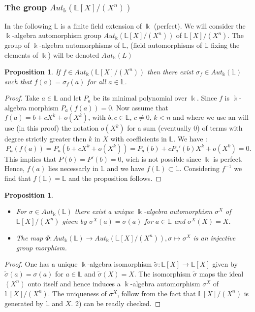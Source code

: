 \documentclass[12pt, reqno]{amsart}
\newtheorem{proposition}[theorem]{Proposition}
\newcommand{\K}{ {\Bbbk} }
\newcommand{\FL}{ {\mathbb L} }
\begin{document}
\subsubsection{The group $Aut_\K(\FL[X]/(X^n))$}
In the following $\FL$ is a finite field extension of $\K$ (perfect). We will consider the $\K$-algebra automorphism group $Aut_\K(\FL[X]/(X^n))$ of $\FL[X]/(X^n)$. The group of $\K$-algebra automorphisms of $\FL$, (field automorphisms of $\FL$ fixing the elements of $\K$) will be denoted $Aut_\K(L)$
\begin{proposition}\label{sigma}
If $f\in Aut_\K(\FL[X]/(X^n))$ then there exist $\sigma_f \in Aut_\K(\FL)$ such that $f(a)=\sigma_f(a)$ for all $a\in \FL$. 
\end{proposition}
\begin{proof}
Take $a\in \FL$ and let $P_a$ be its minimal polynomial over $\K$. Since $f$ is $\K$-algebra morphism $P_a(f(a))=0$. Now assume that $f(a)=b+cX^k+o(X^k)$, with $b,c \in \FL$, $c\neq 0$, $k<n$ and where we use an will use (in this proof) the notation $o(X^k)$ for a sum (eventually $0$) of terms with degree strictly greater then $k$ in $X$ with coefficients in $\FL$. We have  :
$$P_a(f(a))=P_a(b+cX^k+o(X^k))=P_a(b)+cP_a'(b)X^k+o(X^k)=0.$$
This implies that $P(b)=P'(b)=0$, wich is not possible since $\K$ is perfect. Hence, $f(a)$ lies necessarly in $\FL$ and we have $f(\FL)\subset \FL$. Considering $f^{-1}$ we find that $f(\FL)=\FL$ and the proposition follows. 
\end{proof}
\begin{proposition}
\begin{itemize}
\item[1)] For $\sigma \in Aut_\K(\FL)$ there exist a unique $\K$-algebra automorphism $\sigma^X$ of $\FL[X]/(X^n)$ given by $\sigma^X(a)=\sigma(a)$ for $a\in \FL$ and $\sigma^X(X)=X$.
\item[2)] The map $\Phi :Aut_\K(\FL)\to Aut_\K(\FL[X]/(X^n)), \sigma \mapsto \sigma^X$ is an injective group morphism. 
\end{itemize}
\end{proposition}
\begin{proof}
One has a unique $\K$-algebra isomorphism $\tilde{\sigma} :\FL[X]\to \FL[X]$ given by $\tilde{\sigma}(a)=\sigma(a)$ for $a\in \FL$ and $\tilde{\sigma}(X)=X$. The isomorphism $\tilde{\sigma}$ maps the ideal $(X^n)$ onto itself and hence induces a $\K$-algebra automorphism $\sigma^X$ of $\FL[X]/(X^n)$. The uniqueness of $\sigma^X$, follow from the fact that $\FL[X]/(X^n)$ is generated by $\FL$ and $X$. 2) can be readly checked.
\end{proof}
\end{document}

